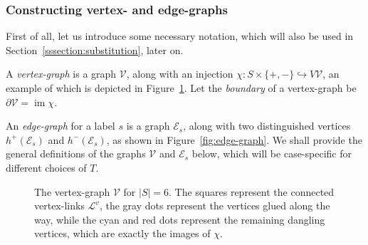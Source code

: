 \documentclass[10pt,a4paper]{amsart}
\makeatletter
\theoremstyle{definition}
\let\sourceMathSetMacro\pgfmathsetmacro
\let\sourceMathTruncateMacro\pgfmathtruncatemacro
\def\sourceConsumeMathSemicolon{\@ifnextchar;{\@gobble}{}}
\def\pgfmathsetmacro#1#2{\ifcsname sourceInteger\string#1\endcsname\sourceMathTruncateMacro{#1}{#2}\else\sourceMathSetMacro{#1}{#2}\fi\sourceConsumeMathSemicolon}
\def\pgfmathtruncatemacro#1#2{\sourceMathTruncateMacro{#1}{#2}\sourceConsumeMathSemicolon}
\newcommand{\cL}{\mathcal{L}}
\newcommand{\cV}{\mathcal{V}}
\newcommand{\cE}{\mathcal{E}}
\DeclareMathOperator{\im}{im}
\makeatother
\begin{document}
\subsubsection{Constructing vertex- and edge-graphs}\label{sssection:edge-and-vertex-graphs}

First of all, let us introduce some necessary notation, which will also be used in Section~\ref{sssection:substitution}, later on.
 
A \emph{vertex-graph} is a graph $\cV$, along with an injection $\chi : S\times\{+,-\} \hookrightarrow V\cV$, an example of which is depicted in Figure~\ref{fig:vertex-graph-5gen}. Let the \emph{boundary} of a vertex-graph be $\partial \cV = \im \chi$. 

An \emph{edge-graph} for a label $s$ is a graph $\cE_s$, along with two distinguished vertices $h^{+}(\cE_s)$ and $h^{-}(\cE_s)$, as shown in Figure~\ref{fig:edge-graph}. We shall provide the general definitions of the graphs $\cV$ and $\cE_s$ below, which will be case-specific for different choices of $T$. 

\begin{figure}[htb]
\centering


\caption{The vertex-graph $\cV$ for $|S|=6$. The squares represent the connected vertex-links $\cL^v$, the gray dots represent the vertices glued along the way, while the cyan and red dots represent the remaining dangling vertices, which are exactly the images of $\chi$.}\label{fig:vertex-graph-5gen}
\end{figure}
\end{document}
